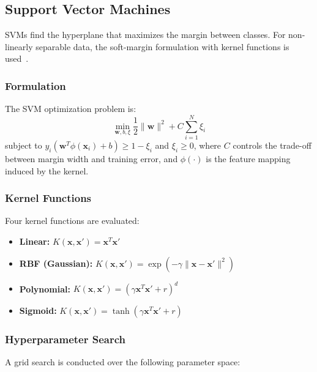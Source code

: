 \documentclass{acm_proc_article-sp}
\begin{document}
\subsection{Support Vector Machines}

SVMs find the hyperplane that maximizes the margin between classes. For non-linearly separable data, the soft-margin formulation with kernel functions is used~\cite{cortes1995}.

\subsubsection{Formulation}
The SVM optimization problem is:
\begin{equation}
\min_{\mathbf{w}, b, \xi} \frac{1}{2}\|\mathbf{w}\|^2 + C \sum_{i=1}^N \xi_i
\end{equation}
subject to $y_i(\mathbf{w}^T \phi(\mathbf{x}_i) + b) \geq 1 - \xi_i$ and $\xi_i \geq 0$, where $C$ controls the trade-off between margin width and training error, and $\phi(\cdot)$ is the feature mapping induced by the kernel.

\subsubsection{Kernel Functions}
Four kernel functions are evaluated:

\begin{itemize}
\item \textbf{Linear:} $K(\mathbf{x}, \mathbf{x}') = \mathbf{x}^T \mathbf{x}'$
\item \textbf{RBF (Gaussian):} $K(\mathbf{x}, \mathbf{x}') = \exp(-\gamma \|\mathbf{x} - \mathbf{x}'\|^2)$
\item \textbf{Polynomial:} $K(\mathbf{x}, \mathbf{x}') = (\gamma \mathbf{x}^T \mathbf{x}' + r)^d$
\item \textbf{Sigmoid:} $K(\mathbf{x}, \mathbf{x}') = \tanh(\gamma \mathbf{x}^T \mathbf{x}' + r)$
\end{itemize}

\subsubsection{Hyperparameter Search}
A grid search is conducted over the following parameter space:
\end{document}
